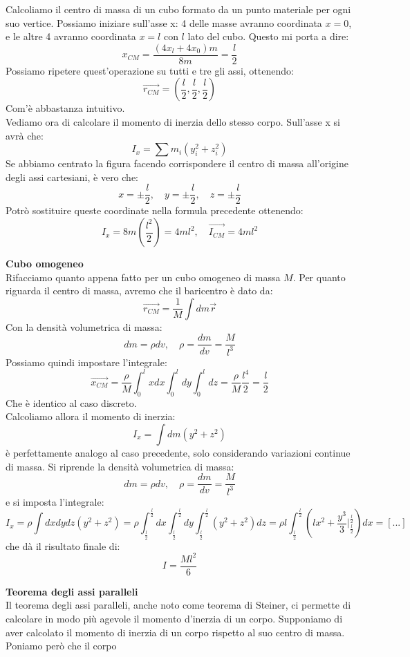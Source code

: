 \documentclass[a4paper,12pt]{article}
\begin{document}
Calcoliamo il centro di massa di un cubo formato da un punto materiale per ogni suo vertice. Possiamo iniziare
sull'asse x: 4 delle masse avranno coordinata $x=0$, e le altre 4 avranno coordinata $x=l$ con $l$ lato del cubo.
Questo mi porta a dire:
$$ x_{CM} = \frac{(4x_l + 4x_0)m}{8m} = \frac{l}{2} $$
Possiamo ripetere quest'operazione su tutti e tre gli assi, ottenendo:
$$ \vec{r_{CM}} = \left(\frac{l}{2}, \frac{l}{2}, \frac{l}{2}\right) $$
Com'è abbastanza intuitivo. \\
Vediamo ora di calcolare il momento di inerzia dello stesso corpo. Sull'asse x si avrà che:
$$ I_x = \sum m_i (y_i^2 + z_i^2) $$
Se abbiamo centrato la figura facendo corrispondere il centro di massa all'origine degli assi cartesiani, è vero che:
$$ x = \pm \frac{l}{2}, \quad y = \pm \frac{l}{2}, \quad z = \pm \frac{l}{2} $$
Potrò sostituire queste coordinate nella formula precedente ottenendo:
$$ I_x = 8m\left(\frac{l^2}{2}\right) = 4ml^2, \quad \vec{I_{CM}} = 4ml^2 $$
\par\smallskip
\textbf{Cubo omogeneo} \\
Rifacciamo quanto appena fatto per un cubo omogeneo di massa $M$. Per quanto riguarda il centro di massa, avremo
che il baricentro è dato da:
$$ \vec{r_{CM}} = \frac{1}{M} \int dm \vec{r} $$
Con la densità volumetrica di massa: 
$$ dm = \rho dv, \quad \rho = \frac{dm}{dv} = \frac{M}{l^3} $$
Possiamo quindi impostare l'integrale:
$$ \vec{x_{CM}} = \frac{\rho}{M} \int_0^l x dx \int_0^l dy \int_0^l dz = \frac{\rho}{M}\frac{l^4}{2} = \frac{l}{2} $$
Che è identico al caso discreto. \\ Calcoliamo allora il momento di inerzia:
$$ I_x = \int dm(y^2+z^2) $$
è perfettamente analogo al caso precedente, solo considerando variazioni continue di massa. Si riprende la
densità volumetrica di massa:
$$ dm = \rho dv, \quad \rho = \frac{dm}{dv} = \frac{M}{l^3} $$
e si imposta l'integrale:
$$ I_x = \rho\int dxdydz(y^2+z^2) = \rho\int_{\frac{l}{2}}^{\frac{l}{2}} dx \int_{\frac{l}{2}}^{\frac{l}{2}} dy \int_{\frac{l}{2}}^{\frac{l}{2}} (y^2+z^2)dz = \rho l \int_{\frac{l}{2}}^{\frac{l}{2}} (lx^2 + \frac{y^3}{3}\Bigg|^{\frac{l}{2}}_{\frac{l}{2}})dx = [...] $$
che dà il risultato finale di:
$$ I = \frac{Ml^2}{6}$$
\par\smallskip
\textbf{Teorema degli assi paralleli} \\
Il teorema degli assi paralleli, anche noto come teorema di Steiner, ci permette di calcolare in modo più agevole il momento d'inerzia
di un corpo. Supponiamo di aver calcolato il momento di inerzia di un corpo rispetto al suo centro di massa. Poniamo però che il corpo
\end{document}
